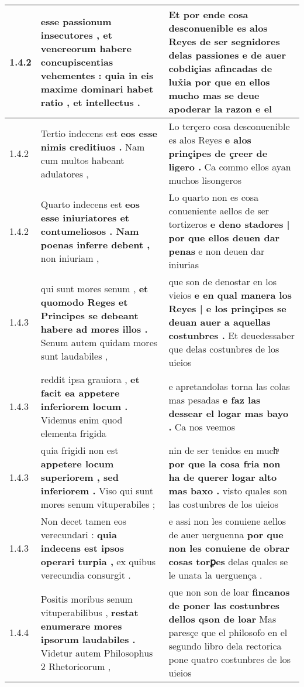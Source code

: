 \begin{tabular}{|p{1cm}|p{6.5cm}|p{6.5cm}|}
1.4.2 & esse passionum insecutores , \textbf{ et venereorum habere concupiscentias vehementes : } quia in eis maxime dominari habet ratio , et intellectus . & Et por ende cosa desconuenible es alos Reyes de ser segnidores delas passiones \textbf{ e de auer cobdiçias afincadas de lux̉ia } por que en ellos mucho mas se deue apoderar la razon e el \\\hline
1.4.2 & Tertio indecens est \textbf{ eos esse nimis creditiuos . } Nam cum multos habeant adulatores , & Lo terçero cosa desconuenible es alos Reyes \textbf{ e alos prinçipes de çreer de ligero . } Ca commo ellos ayan muchos lisongeros \\\hline
1.4.2 & Quarto indecens est \textbf{ eos esse iniuriatores et contumeliosos . Nam poenas inferre debent , } non iniuriam , & Lo quarto non es cosa conueniente aellos de ser tortizeros \textbf{ e deno stadores | por que ellos deuen dar penas } e non deuen dar iniurias \\\hline
1.4.3 & qui sunt mores senum , \textbf{ et quomodo Reges et Principes se debeant habere ad mores illos . } Senum autem quidam mores sunt laudabiles , & que son de denostar en los vieios \textbf{ e en qual manera los Reyes | e los prinçipes se deuan auer a aquellas costunbres . } Et deuedessaber que delas costunbres de los uieios \\\hline
1.4.3 & reddit ipsa grauiora , \textbf{ et facit ea appetere inferiorem locum . } Videmus enim quod elementa frigida & e apretandolas torna las colas mas pesadas \textbf{ e faz las dessear el logar mas bayo . } Ca nos veemos \\\hline
1.4.3 & quia frigidi non est \textbf{ appetere locum superiorem , sed inferiorem . } Viso qui sunt mores senum vituperabiles ; & nin de ser tenidos en muchͣ \textbf{ por que la cosa fria non ha de querer logar alto mas baxo . } visto quales son las costunbres de los uieios \\\hline
1.4.3 & Non decet tamen eos verecundari : \textbf{ quia indecens est ipsos operari turpia , } ex quibus verecundia consurgit . & e assi non les conuiene aellos de auer uerguenna \textbf{ por que non les conuiene de obrar cosas torꝑes } delas quales se le unata la uerguença . \\\hline
1.4.4 & Positis moribus senum vituperabilibus , \textbf{ restat enumerare mores ipsorum laudabiles . } Videtur autem Philosophus 2 Rhetoricorum , & que non son de loar \textbf{ fincanos de poner las costunbres dellos qson de loar } Mas paresçe que el philosofo en el segundo libro dela rectorica pone quatro costunbres de los uieios \\\hline

\end{tabular}
